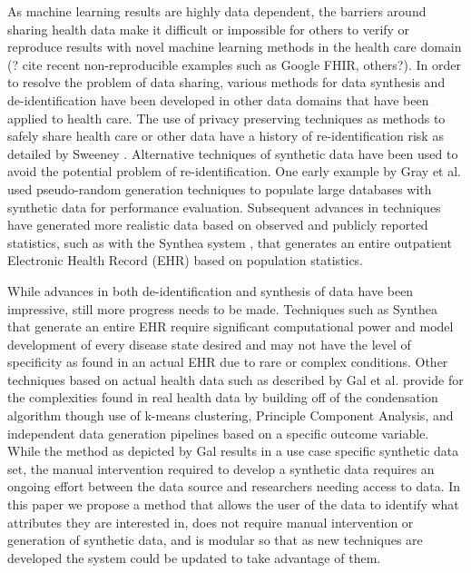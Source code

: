  As machine learning results are highly data dependent, the barriers around sharing health data make it difficult or impossible for others to verify or reproduce results with novel machine learning methods in the health care domain (? cite recent non-reproducible examples such as Google FHIR, others?). In order to resolve the problem of data sharing, various methods for data synthesis and de-identification have been developed in other data domains that have been applied to health care. The use of privacy preserving techniques as methods to safely share health care or other data have a history of re-identification risk as detailed by Sweeney \cite{sweeney_2002}. Alternative techniques of synthetic data have been used to avoid the potential problem of re-identification. One early example by Gray et al. \cite{gray_quickly_1994} used pseudo-random generation techniques to populate large databases with synthetic data for performance evaluation. Subsequent advances in techniques have generated more realistic data based on observed and publicly reported statistics, such as with the Synthea system \cite{walonoski_synthea:_2018}, that generates an entire outpatient Electronic Health Record (EHR) based on population statistics. 
 
 While advances in both de-identification and synthesis of data have been impressive, still more progress needs to be made. Techniques such as Synthea that generate an entire EHR require significant computational power and model development of every disease state desired and may not have the level of specificity as found in an actual EHR due to rare or complex conditions. Other techniques based on actual health data such as described by Gal et al. \cite{gal_data_2014} provide for the complexities found in real health data by building off of the condensation algorithm \cite{aggarwal_static_2008} though use of k-means clustering, Principle Component Analysis, and independent data generation pipelines based on a specific outcome variable. While the method as depicted by Gal results in a use case specific synthetic data set, the manual intervention required to develop a synthetic data requires an ongoing effort between the data source and researchers needing access to data. In this paper we propose a method that allows the user of the data to identify what attributes they are interested in, does not require manual intervention or generation of synthetic data, and is modular so that as new techniques are developed the system could be updated to take advantage of them.
 

